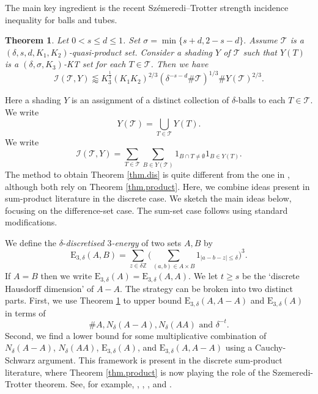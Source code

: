 \documentclass[12pt]{amsart}
\newtheorem{theorem}{Theorem}[section]
\newcommand{\Z}{\mathbb{Z}}
\newcommand{\les}{\lessapprox}
\newcommand{\cT}{\mathcal{T}}
\newcommand{\cI}{\mathcal{I}}
\newcommand{\1}{\mathbf{1}}
\newcommand{\en}[2]{\mathrm{E}_{#1,#2}}
\newcommand{\de}{\delta}
\newcommand{\cn}[1]{N_\de({#1})}
\begin{document}
The main key ingredient is the recent Sz\'emeredi--Trotter strength incidence inequality for balls and tubes.
    \begin{theorem}
		\label{maininct}\label{thm.product}
		Let $0<s\leq d \leq 1$. Set $\sigma = \min \{s+d,2-s-d\}.$
		Assume $\cT$ is a $(\delta,s,d,K_1,K_2)$-quasi-product set. Consider a shading $Y$ of $\cT$ such that $Y(T)$ is a $(\delta,\sigma,K_3)$-KT set for each $T\in\cT$. Then  we have
		$$\cI(\cT,Y) \les K_3^{\frac13}(K_1K_2)^{2/3} (\delta^{-s-d}\#\cT)^{1/{3}}\# Y(\cT)^{2/3}.$$	
	\end{theorem}
    Here a shading $Y$ is an assignment of a distinct collection of $\de$-balls to each $T \in \cT.$ We write
    $$Y(\cT) = \bigcup_{T \in \cT} Y(T).$$
    We write
    $$\cI(\cT,Y) = \sum_{T \in \cT}\sum_{B \in Y(\cT)} 1_{B \cap T \neq \emptyset}1_{B \in Y(T)}.$$
    The method to obtain Theorem \ref{thm.dis} is quite different from the one in \cite{doprod}, although both rely on Theorem \ref{thm.product}.
Here, we combine ideas present in sum-product literature in the discrete case.
We sketch the main ideas below, focusing on the difference-set case. The sum-set case follows
using standard modifications.

We define the $\de$-\textit{discretised $3$-energy} of two sets $A,B$ by
\begin{equation}
	\en 3 \de (A,B) = \sum_{z \in \de \Z} \Big(\sum_{(a,b) \in A \times B} 1_{|a-b -z| \leq \de}\Big)^3.
\end{equation}
If $A=B$ then we write $\en 3\de (A) = \en 3 \de (A,A).$ 
We let $t \geq s$ be the `discrete Hausdorff dimension' of $A-A.$ 
The strategy can be broken into two distinct parts.
First, we use Theorem \ref{maininct} to upper bound $\en 3 \de (A,A-A)$ and $\en 3 \de (A)$ in terms of $$\# A, \cn {A-A}, \cn{AA} \text{ and } \de^{-t}.$$
Second, we find a lower bound for some multiplicative combination of \(\cn{A-A} \), \( \cn{AA}\), \( \en 3 \de(A)\), and \(\en 3 \de (A,A-A)\)
using a Cauchy-Schwarz argument. This framework is present in the discrete sum-product literature,
where Theorem \ref{thm.product} is now playing the role of the Szemeredi-Trotter theorem. See,
for example, \cite{schoenshkrsumsets}, \cite{rud}, \cite{bloom}, and \cite{csumproduct}.
\end{document}
